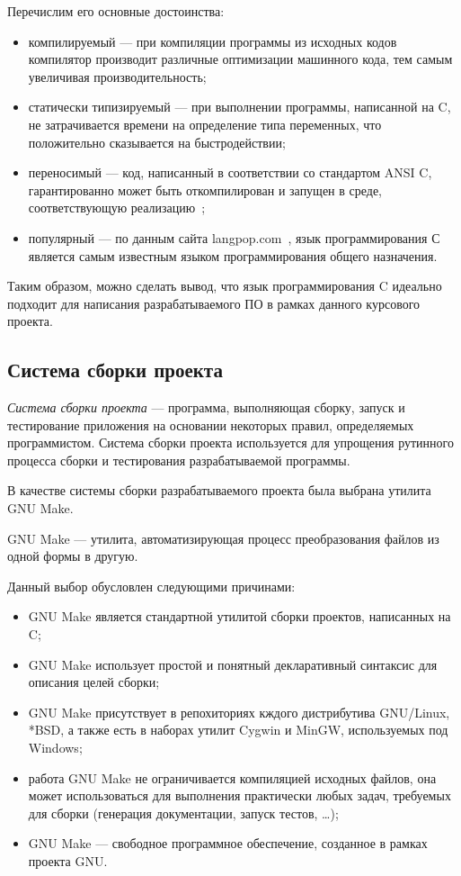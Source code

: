 Перечислим его основные достоинства:
\begin{itemize}
\item компилируемый --- при компиляции программы из исходных кодов
  компилятор производит различные оптимизации машинного кода, 
  тем самым увеличивая производительность;
\item статически типизируемый --- при выполнении программы, написанной на C,
  не затрачивается времени на определение типа переменных,
  что положительно сказывается на быстродействии;
\item переносимый --- код, написанный в соответствии со стандартом ANSI C,
  гарантированно может быть откомпилирован и запущен в среде,
  соответствующую реализацию~\cite{ansi_c};
\item популярный --- по данным сайта langpop.com~\cite{langs_popularity},
  язык программирования С является самым известным языком программирования 
  общего назначения.
\end{itemize}

Таким образом, можно сделать вывод, что язык программирования C идеально 
подходит для написания разрабатываемого ПО в рамках данного курсового проекта. 

\subsection{Система сборки проекта}

\textit{Система сборки проекта} --- программа, выполняющая сборку, 
запуск и тестирование приложения на основании некоторых правил,
определяемых программистом. 
Система сборки проекта используется для упрощения рутинного процесса сборки 
и тестирования разрабатываемой программы.

В качестве системы сборки разрабатываемого проекта была выбрана утилита GNU Make.

GNU Make --- утилита, автоматизирующая процесс преобразования файлов
из одной формы в другую.

Данный выбор обусловлен следующими причинами:
\begin{itemize}
\item GNU Make является стандартной утилитой сборки проектов,
  написанных на C;
\item GNU Make использует простой и понятный декларативный синтаксис для
  описания целей сборки;
\item GNU Make присутствует в репохиториях кждого дистрибутива GNU/Linux, *BSD,
  а также есть в наборах утилит Cygwin и MinGW, используемых под Windows;
\item работа GNU Make не ограничивается компиляцией исходных файлов,
  она может использоваться для выполнения практически любых задач,
  требуемых для сборки (генерация документации, запуск тестов, \dots);
\item GNU Make --- свободное программное обеспечение,
  созданное в рамках проекта GNU.
\end{itemize}

